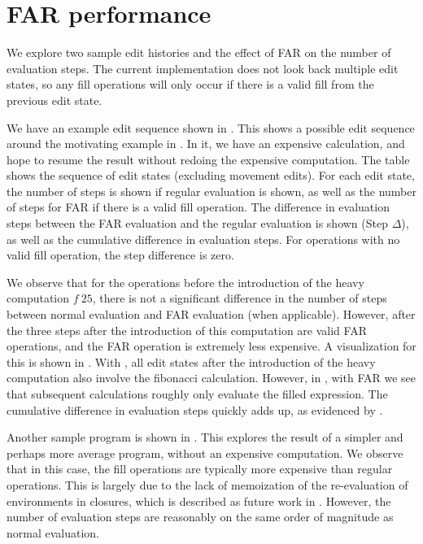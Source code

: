 \section{FAR performance}
\label{sec:evaluation-far}

We explore two sample edit histories and the effect of FAR on the number of evaluation steps. The current implementation does not look back multiple edit states, so any fill operations will only occur if there is a valid fill from the previous edit state.

We have an example edit sequence shown in . This shows a possible edit sequence around the motivating example in . In it, we have an expensive calculation, and hope to resume the result without redoing the expensive computation. The table shows the sequence of edit states (excluding movement edits). For each edit state, the number of steps is shown if regular evaluation is shown, as well as the number of steps for FAR if there is a valid fill operation. The difference in evaluation steps between the FAR evaluation and the regular evaluation is shown (Step $\Delta$), as well as the cumulative difference in evaluation steps. For operations with no valid fill operation, the step difference is zero.

We observe that for the operations before the introduction of the heavy computation $f\ 25$, there is not a significant difference in the number of steps between normal evaluation and FAR evaluation (when applicable). However, after the three steps after the introduction of this computation are valid FAR operations, and the FAR operation is extremely less expensive. A visualization for this is shown in . With , all edit states after the introduction of the heavy computation also involve the fibonacci calculation. However, in , with FAR we see that subsequent calculations roughly only evaluate the filled expression. The cumulative difference in evaluation steps quickly adds up, as evidenced by .

Another sample program is shown in . This explores the result of a simpler and perhaps more average program, without an expensive computation. We observe that in this case, the fill operations are typically more expensive than regular operations. This is largely due to the lack of memoization of the re-evaluation of environments in closures, which is described as future work in . However, the number of evaluation steps are reasonably on the same order of magnitude as normal evaluation.

